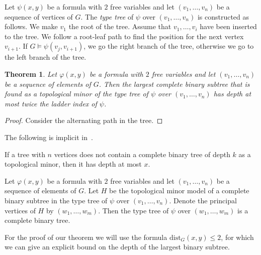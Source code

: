 \documentclass[11pt, fleqn]{article}
\theoremstyle{plain}
\newtheorem{theorem}{Theorem}
\theoremstyle{nonumberplain}
\newtheorem{proof}{Proof.}
\renewcommand{\phi}{\varphi}
\newcommand{\dist}{\mathrm{dist}}
\begin{document}
Let $\psi(x,y)$ be a formula with $2$ free variables and let $(v_1,\ldots, v_n)$
be a sequence of vertices of $G$. The \emph{type tree}
of $\psi$ over $(v_1,\ldots,v_n)$ is constructed as 
follows. We make $v_1$ the root of the tree. Assume that $v_1,\ldots, v_i$
have been inserted to the tree. We follow a root-leaf path to find the
position for the next vertex $v_{i+1}$. If $G\models\psi(v_j,v_{i+1})$, we
go the right branch of the tree, otherwise we go to the left branch of 
the tree. 


\begin{theorem}
Let $\phi(x,y)$ be a formula with $2$ free variables and let
$(v_1,\ldots, v_n)$ be a sequence of elements of $G$. Then the 
largest complete binary subtree that is found as a topological minor 
of the type tree of $\psi$ over
$(v_1,\ldots, v_n)$ has depth at most twice the ladder
index of $\psi$. 
\end{theorem}
\begin{proof}
Consider the alternating path in the tree. 
\end{proof}

The following is implicit in~\cite{malliaris2014regularity}. 

\begin{lemma}[reference?]\label{lem:depth}
If a tree with $n$ vertices does not contain a complete binary 
tree of depth $k$ as a topological minor, then it has depth at most 
$x$. 
\end{lemma}

\begin{lemma}\label{lem:minor-to-tree}
Let $\phi(x,y)$ be a formula with $2$ free variables and let
$(v_1,\ldots, v_n)$ be a sequence of elements of $G$. Let $H$
be the topological minor model of a complete binary subtree in the
type tree of $\psi$ over $(v_1,\ldots, v_n)$. Denote the 
principal vertices of $H$ by $(w_1,\ldots, w_m)$. Then the type
tree of $\psi$ over $(w_1,\ldots, w_m)$ is a complete binary
tree. 
\end{lemma}

For the proof of our theorem we will use the formula 
$\dist_G(x,y)\leq 2$, for which we can give an explicit 
bound on the depth of the largest binary subtree.
\end{document}
